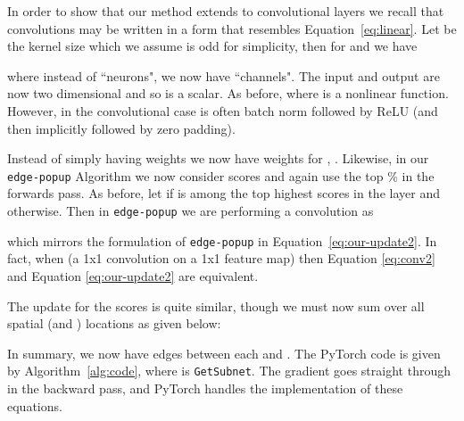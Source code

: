 \documentclass[10pt,twocolumn,letterpaper]{article}
\newcommand{\alg}{\texttt{edge-popup} }
\begin{document}
In order to show that our method extends to convolutional layers we recall that convolutions may be written in a form that resembles Equation~\ref{eq:linear}. Let  be the kernel size which we assume is odd for simplicity, then for  and  we have

where instead of ``neurons", we now have ``channels". The input  and output  are now two dimensional and so  is a scalar. As before,  where  is a nonlinear function. However, in the convolutional case  is often batch norm \cite{batchnorm} followed by ReLU (and then implicitly followed by zero padding).






Instead of simply having weights  we now have weights  for , . Likewise, in our \alg Algorithm we now consider scores  and again use the top \% in the forwards pass. As before, let  if  is among the top  highest scores in the layer and  otherwise. Then in \alg we are performing a convolution as

which mirrors the formulation of \alg in Equation~\ref{eq:our-update2}.  In fact, when  (\ie a 1x1 convolution on a 1x1 feature map) then Equation \ref{eq:conv2} and Equation \ref{eq:our-update2} are equivalent. 

The update for the scores is quite similar, though we must now sum over all spatial (\ie  and ) locations as given below:


In summary, we now have  edges between each  and .
The PyTorch \cite{pytorch} code is given by Algorithm~\ref{alg:code}, where  is \texttt{GetSubnet}. The gradient goes straight through  in the backward pass, and PyTorch handles the implementation of these equations.
\end{document}
